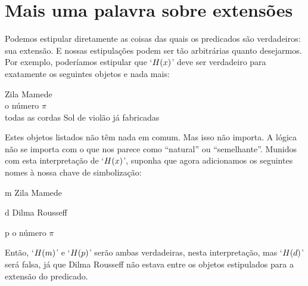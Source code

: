 \section{Mais uma palavra sobre extensões}
Podemos estipular diretamente as coisas das quais os predicados são verdadeiros: sua extensão.
E nossas estipulações podem ser tão arbitrárias quanto desejarmos.
Por exemplo, poderíamos estipular que `$\mathord{H}(x)$' deve ser verdadeiro para exatamente os seguintes objetos e nada mais:
	\begin{center}
		Zila Mamede\\
		o número $\pi$\\
		todas as cordas Sol de violão já fabricadas
	\end{center}
Estes objetos listados não têm nada em comum.
Mas isso não importa.
A lógica não se importa com o que nos parece como ``natural'' ou ``semelhante''.
Munidos com esta interpretação de `$\mathord{H}(x)$', suponha que agora adicionamos os seguintes nomes à nossa chave de simbolização:
	\begin{ekey}
		\item[m] Zila Mamede
		\item[d] Dilma Rousseff
		\item[p] o número $\pi$
	\end{ekey}
Então, `$\mathord{H}(m)$' e `$\mathord{H}(p)$' serão ambas verdadeiras, nesta interpretação, mas `$\mathord{H}(d)$' será falsa, já que Dilma Rousseff não estava entre os objetos estipulados para a extensão do predicado.


